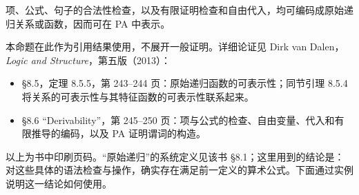\documentclass[lang=cn,a4paper,fontset=none,zihao=false,10pt,openany,twoside]{beautybook}
\numberwithin{algorithm}{chapter}
\begin{document}
\begin{proposition}[语法操作的算术表示]\label{prop:syntax-represent}
项、公式、句子的合法性检查，以及有限证明检查和自由代入，均可编码成原始递归关系或函数，因而可在 PA 中表示。
\end{proposition}
本命题在此作为引用结果使用，不展开一般证明。详细论证见 Dirk van Dalen，\emph{Logic and Structure}，第五版（2013）：
\begin{itemize}
\item §8.5，定理 8.5.5，第 243--244 页：原始递归函数的可表示性；同节引理 8.5.4 将关系的可表示性与其特征函数的可表示性联系起来。
\item §8.6 ``Derivability''，第 245--250 页：项与公式的检查、自由变量、代入和有限推导的编码，以及 PA 证明谓词的构造。
\end{itemize}
以上为书中印刷页码。“原始递归”的系统定义见该书 §8.1；这里用到的结论是：对这些具体的语法检查与操作，确实存在满足前一定义的算术公式。下面通过实例说明这一结论如何使用。
\end{document}
